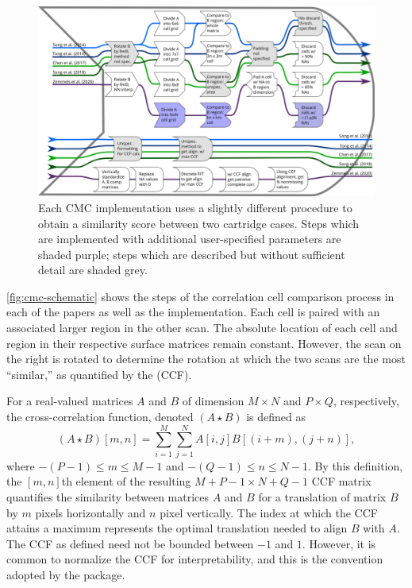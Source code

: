 \begin{figure}
\includegraphics[width=\textwidth]{images/cmc_flow.png}
\caption{Each CMC implementation uses a slightly different procedure to obtain a similarity score between two cartridge cases. Steps which are implemented with additional user-specified parameters are shaded purple; steps which are described but without sufficient detail are shaded grey.}\label{fig:cmc-schematic}
\end{figure}

\autoref{fig:cmc-schematic} shows the steps of the correlation cell
comparison process in each of the papers as well as the 
implementation. Each cell is paired with an associated larger region in
the other scan. The absolute location of each cell and region in their
respective surface matrices remain constant. However, the scan on the
right is rotated to determine the rotation at which the two scans are
the most ``similar,'' as quantified by the
 (CCF).

For a real-valued matrices \(A\) and \(B\) of dimension \(M \times N\)
and \(P \times Q\), respectively, the cross-correlation function,
denoted \((A \star B)\) is defined as \[
(A \star B)[m,n] = \sum_{i=1}^M \sum_{j=1}^N A[i,j] B[(i + m), (j + n)],
\] where \(-(P-1) \leq m \leq M-1\) and \(-(Q-1) \leq n \leq N-1\). By
this definition, the \([m,n]\)th element of the resulting
\(M + P - 1 \times N + Q - 1\) CCF matrix quantifies the similarity
between matrices \(A\) and \(B\) for a translation of matrix \(B\) by
\(m\) pixels horizontally and \(n\) pixel vertically. The index at which
the CCF attains a maximum represents the optimal translation needed to
align \(B\) with \(A\). The CCF as defined need not be bounded between
\(-1\) and \(1\). However, it is common to normalize the CCF for
interpretability, and this is the convention adopted by the
 package.

